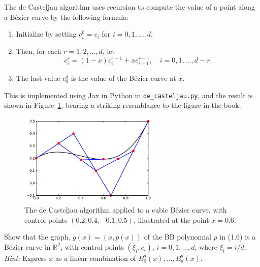 \begin{solution}
    The de Casteljau algorithm uses recursion to compute the value of a point along a Bézier curve by the following formula:
    \begin{enumerate}
        \item Initialize by setting $c_i^0 = c_i$ for $i = 0, 1, \ldots, d$.
        \item Then, for each $r = 1, 2, \ldots, d$, let
            \begin{equation*}
                c_i^r = (1 - x) c_i^{r-1} + x c_{i+1}^{r-1},
                \quad i = 0, 1, \ldots, d - r.
            \end{equation*}
        \item The last value $c_0^d$ is the value of the Bézier curve at $x$.
    \end{enumerate}

    This is implemented using Jax in Python in \verb|de_casteljau.py|, and the result is shown in Figure~\ref{fig:de_casteljau}, bearing a striking resemblance to the figure in the book.
    \begin{figure}[!ht]
        \centering
        \includegraphics[width=0.6\textwidth]{1_bb_poly/de_casteljau.pdf}
        \caption{The de Casteljau algorithm applied to a cubic Bézier curve, with control points $(0.2, 0.4, -0.1, 0.5)$, illustrated at the point $x = 0.6$.\label{fig:de_casteljau}}
    \end{figure}
\end{solution}

\begin{exercise}
    Show that the graph, $g(x) = (x, p(x))$ of the BB polynomial $p$ in (1.6) is a Bézier curve in $\mathbb{R}^2$, with control points $(\xi_i, c_i)$, $i = 0, 1, \ldots, d$, where $\xi_i = i/d$.
    \textit{Hint:} Express $x$ as a linear combination of $B_0^d(x), \ldots, B_d^d(x)$.
\end{exercise}

